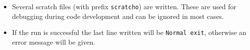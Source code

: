 \begin{itemize}
            {
            \squish
            \begin{enumerate}
            \item {} \mfus\ prefix .
            \end{enumerate}
            }
            
        There may be advantages to using a standard prefix naming convention, such as portability of post-processing scripts or \tecplot\ layout files.
    \item Several scratch files (with prefix \texttt{scratcho}) are written. These are used for debugging during code development and can be ignored in most cases.
    \item If the run is successful the last line written will be \texttt{Normal exit}, otherwise an error message will be given.
\end{itemize}

